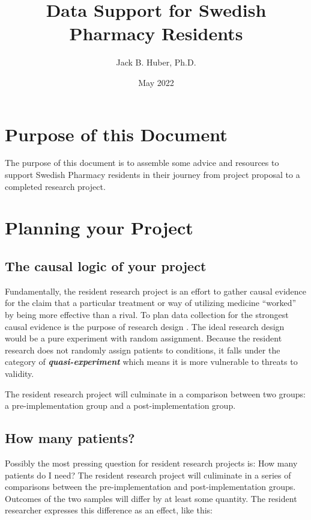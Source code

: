 \documentclass[
]{report}
\title{Data Support for Swedish Pharmacy Residents}
\author{Jack B. Huber, Ph.D.}
\date{May 2022}
\begin{document}
\maketitle

\hypertarget{purpose-of-this-document}{%
\chapter{Purpose of this Document}\label{purpose-of-this-document}}

The purpose of this document is to assemble some advice and resources to
support Swedish Pharmacy residents in their journey from project
proposal to a completed research project.

\hypertarget{planning-your-project}{%
\chapter{Planning your Project}\label{planning-your-project}}

\hypertarget{the-causal-logic-of-your-project}{%
\section{The causal logic of your
project}\label{the-causal-logic-of-your-project}}

Fundamentally, the resident research project is an effort to gather
causal evidence for the claim that a particular treatment or way of
utilizing medicine ``worked'' by being more effective than a rival. To
plan data collection for the strongest causal evidence is the purpose of
research design \citep{CampbellStanley1963}. The ideal research design
would be a pure experiment with random assignment. Because the resident
research does not randomly assign patients to conditions, it falls under
the category of \emph{\textbf{quasi-experiment}} which means it is more
vulnerable to threats to validity.

The resident research project will culminate in a comparison between two
groups: a pre-implementation group and a post-implementation group.

\hypertarget{how-many-patients}{%
\section{How many patients?}\label{how-many-patients}}

Possibly the most pressing question for resident research projects is:
How many patients do I need? The resident research project will
culiminate in a series of comparisons between the pre-implementation and
post-implementation groups. Outcomes of the two samples will differ by
at least some quantity. The resident researcher expresses this
difference as an effect, like this:
\end{document}
